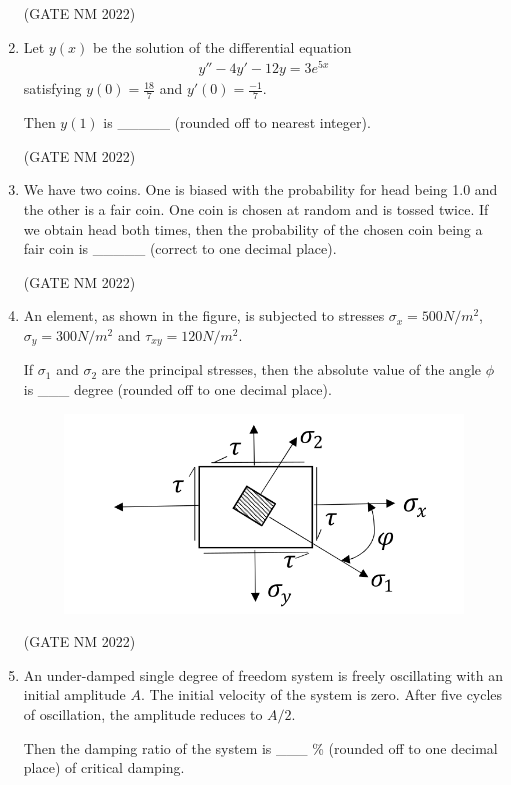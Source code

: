 \documentclass[journal,12pt,onecolumn]{IEEEtran}
\theoremstyle{remark}
\begin{document}
\begin{enumerate}
\hfill(GATE NM 2022)





\item  Let $y(x)$ be the solution of the differential equation  
\begin{align*}
y'' - 4y' - 12y = 3e^{5x}
\end{align*}
satisfying $y(0) = {\frac{18}{7}}$ and $y'(0) = {\frac{-1}{7}}$.  

Then $y(1)$ is \_\_\_\_\_ (rounded off to nearest integer).

\hfill(GATE NM 2022)




\item
We have two coins. One is biased with the probability for head being 1.0 and the other is a fair coin. One coin is chosen at random and is tossed twice. If we obtain head both times, then the probability of the chosen coin being a fair coin is \_\_\_\_\_  (correct to one decimal place).

\hfill(GATE NM 2022)








\item
An element, as shown in the figure, is subjected to stresses $\sigma_x = 500  N/m^2 $, $\sigma_y = 300  N/m^2 $ and $\tau_{xy} = 120  N/m^2 $.  

If $\sigma_1$ and $\sigma_2$ are the principal stresses, then the absolute value of the angle $\phi$ is \_\_\_ degree (rounded off to one decimal place).

\begin{figure}[h]
\centering
\includegraphics[width=0.3\columnwidth]{fig9}
\caption{}
\label{fig:placeholder}
\end{figure}

\hfill(GATE NM 2022)



\item
An under-damped single degree of freedom system is freely oscillating with an initial amplitude $A$. The initial velocity of the system is zero. After five cycles of oscillation, the amplitude reduces to $A/2$.  

Then the damping ratio of the system is \_\_\_ \% (rounded off to one decimal place) of critical damping.



\end{enumerate}
\end{document}
